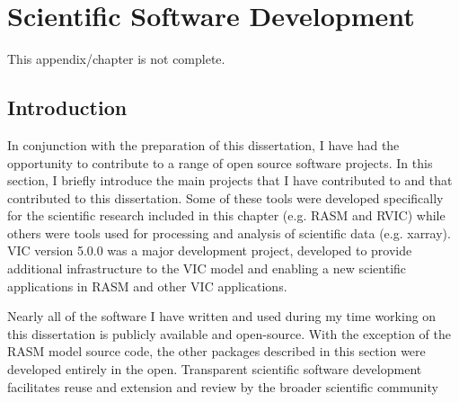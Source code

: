 \appendix
\raggedbottom\sloppy

\chapter{Scientific Software Development}
\label{chap:software}

This appendix/chapter is not complete.

\section{Introduction}
In conjunction with the preparation of this dissertation, I have had the opportunity to contribute to a range of open source software projects.
In this section, I briefly introduce the main projects that I have contributed to and that contributed to this dissertation.
Some of these tools were developed specifically for the scientific research included in this chapter (e.g. RASM and RVIC) while others were tools used for processing and analysis of scientific data (e.g. xarray).
VIC version 5.0.0 was a major development project, developed to provide additional infrastructure to the VIC model and enabling a new scientific applications in RASM and other VIC applications.

Nearly all of the software I have written and used during my time working on this dissertation is publicly available and open-source.
With the exception of the RASM model source code, the other packages described in this section were developed entirely in the open.
Transparent scientific software development facilitates reuse and extension and review by the broader scientific community

